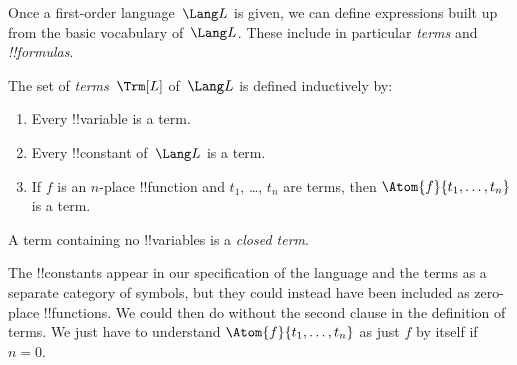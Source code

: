 \documentclass[../../include/open-logic-section]{subfiles}
\begin{document}


Once a first-order language~$\Lang L$ is given, we can define
expressions built up from the basic vocabulary of~$\Lang L$.  These
include in particular \emph{terms} and \emph{!!{formula}s}.

\begin{defn}[Terms]
The set of \emph{terms}~$\Trm[L]$ of~$\Lang L$ is
defined inductively by:
\begin{enumerate}
\item Every !!{variable} is a term.
\item Every !!{constant} of~$\Lang L$ is a term.
\item If $f$ is an $n$-place !!{function} and $t_1$, \dots, $t_n$
  are terms, then $\Atom{f}{t_1, \ldots, t_n}$ is a term.
\end{enumerate}
A term containing no !!{variable}s is a \emph{closed term}.
\end{defn}

\begin{explain}
The !!{constant}s appear in our specification of the language and the
terms as a separate category of symbols, but they could instead have
been included as zero-place !!{function}s.  We could then do without
the second clause in the definition of terms. We just have to
understand $\Atom{f}{t_1, \ldots, t_n}$ as just $f$ by itself if $n =
0$.
\end{explain}
\end{document}

